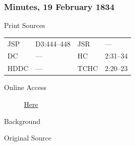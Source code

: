 		\subsubsection{Minutes, 19 February 1834}
			\label{EMS-1834-JS-19-FEB-1834}
			
			\begin{description}
					\item[Print Sources]
				\end{description}

					\begin{tabular}{p{0.5in}p{1in}p{0.5in}p{1in}}
					JSP	 	& D3:444--448		& JSR 		& --- \\
					DC	 	& --- 		& HC 		& 2:31--34 \\
					HDDC 	& ---		& TCHC 		& 2:20--23 \\
					\end{tabular}
				
				\begin{description}
					\item[Online Access] \href{https://www.josephsmithpapers.org/paper-summary/minutes-19-february-1834/1}{Here}
				\end{description}
				
				\begin{description}
					\item[Background]
				\end{description}
				
				
				\begin{description}
					\item[Original Source]
				\end{description}
				
				

